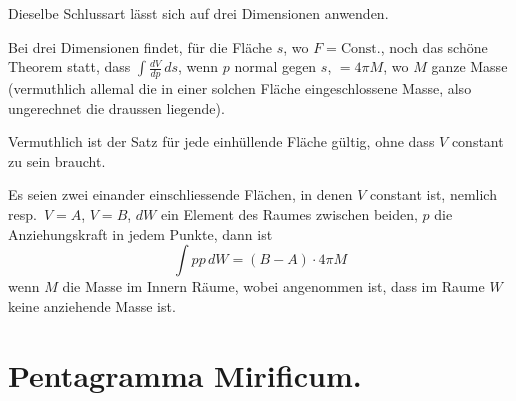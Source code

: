 \documentclass[10pt,a4paper]{article}
\begin{document}
Dieselbe Schlussart l\"asst sich auf drei Dimensionen anwenden.

Bei drei Dimensionen findet, f\"ur die Fl\"ache $s$, wo $F = \text{Const.}$, noch das sch\"one Theorem statt, dass $\int \frac{dV}{dp}\, ds$, wenn $p$ normal gegen $s$, $= 4\pi M$, wo $M$ ganze Masse (vermuthlich allemal die in einer solchen Fl\"ache eingeschlossene Masse, also ungerechnet die draussen liegende).

Vermuthlich ist der Satz f\"ur jede einh\"ullende Fl\"ache g\"ultig, ohne dass $V$ constant zu sein braucht.

Es seien zwei einander einschliessende Fl\"achen, in denen $V$ constant ist, nemlich resp.\ $V = A$, $V = B$, $dW$ ein Element des Raumes zwischen beiden, $p$ die Anziehungskraft in jedem Punkte, dann ist
%
\begin{equation*}
\int pp\, dW = (B - A) \cdot 4\pi M
\end{equation*}
%
wenn $M$ die Masse im Innern R\"aume, wobei angenommen ist, dass im Raume $W$ keine anziehende Masse ist.

\section*{Pentagramma Mirificum.}
\end{document}
